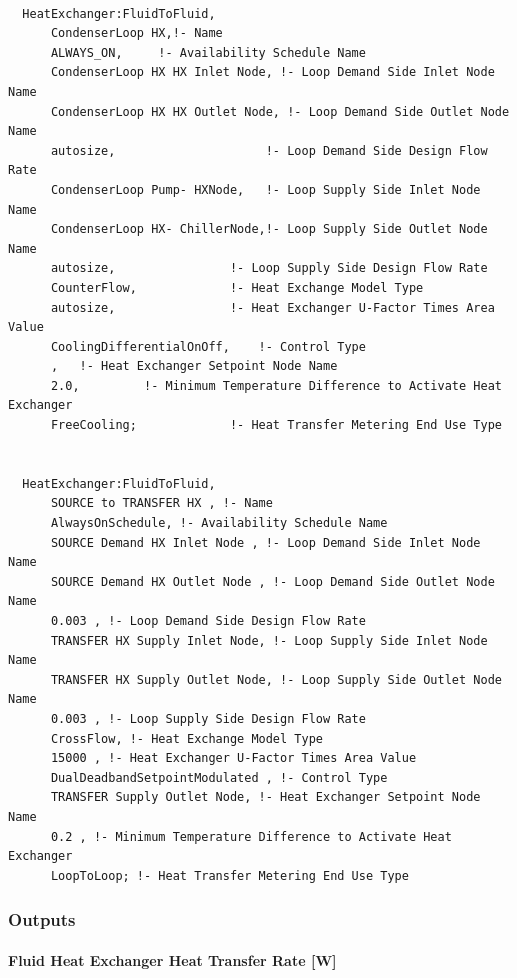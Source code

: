 \begin{lstlisting}

  HeatExchanger:FluidToFluid,
      CondenserLoop HX,!- Name
      ALWAYS_ON,     !- Availability Schedule Name
      CondenserLoop HX HX Inlet Node, !- Loop Demand Side Inlet Node Name
      CondenserLoop HX HX Outlet Node, !- Loop Demand Side Outlet Node Name
      autosize,                     !- Loop Demand Side Design Flow Rate
      CondenserLoop Pump- HXNode,   !- Loop Supply Side Inlet Node Name
      CondenserLoop HX- ChillerNode,!- Loop Supply Side Outlet Node Name
      autosize,                !- Loop Supply Side Design Flow Rate
      CounterFlow,             !- Heat Exchange Model Type
      autosize,                !- Heat Exchanger U-Factor Times Area Value
      CoolingDifferentialOnOff,    !- Control Type
      ,   !- Heat Exchanger Setpoint Node Name
      2.0,         !- Minimum Temperature Difference to Activate Heat Exchanger
      FreeCooling;             !- Heat Transfer Metering End Use Type


  HeatExchanger:FluidToFluid,
      SOURCE to TRANSFER HX , !- Name
      AlwaysOnSchedule, !- Availability Schedule Name
      SOURCE Demand HX Inlet Node , !- Loop Demand Side Inlet Node Name
      SOURCE Demand HX Outlet Node , !- Loop Demand Side Outlet Node Name
      0.003 , !- Loop Demand Side Design Flow Rate
      TRANSFER HX Supply Inlet Node, !- Loop Supply Side Inlet Node Name
      TRANSFER HX Supply Outlet Node, !- Loop Supply Side Outlet Node Name
      0.003 , !- Loop Supply Side Design Flow Rate
      CrossFlow, !- Heat Exchange Model Type
      15000 , !- Heat Exchanger U-Factor Times Area Value
      DualDeadbandSetpointModulated , !- Control Type
      TRANSFER Supply Outlet Node, !- Heat Exchanger Setpoint Node Name
      0.2 , !- Minimum Temperature Difference to Activate Heat Exchanger
      LoopToLoop; !- Heat Transfer Metering End Use Type
\end{lstlisting}

\subsubsection{Outputs}\label{outputs-15}

\paragraph{Fluid Heat Exchanger Heat Transfer Rate {[}W{]}}\label{fluid-heat-exchanger-heat-transfer-rate-w}

